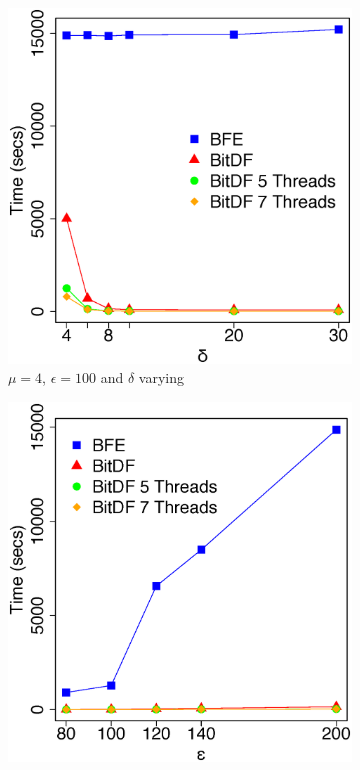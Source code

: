 {\begin{figure}[h!]
    \centering
    \begin{subfigure}[t]{0.49\textwidth}
        \includegraphics[width=\textwidth]{images/Brinkhoff_complete_varying_l.eps}
        \caption{$\mu = 4$, $\epsilon = 100$ and $\delta$ varying}
        \label{fig:brinkhoff_complete_vary_l}
    \end{subfigure}
    \begin{subfigure}[t]{0.49\textwidth}
        \includegraphics[width=\textwidth]{images/Brinkhoff_complete_varying_g.eps}

\end{subfigure}
\end{figure}}
